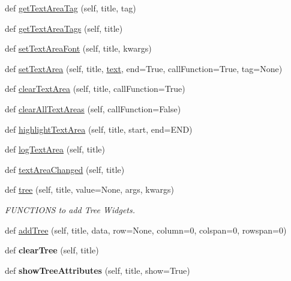 \begin{DoxyCompactItemize}
def \hyperlink{classappjar_1_1gui_a5a0ff51d6c6eb80d9117818b5d18c37d}{get\+Text\+Area\+Tag} (self, title, tag)
\item 
def \hyperlink{classappjar_1_1gui_ab5562f151c9c5f03933d41e09f838507}{get\+Text\+Area\+Tags} (self, title)
\item 
def \hyperlink{classappjar_1_1gui_abbd1a46a2540c6978dbc155158cf46ec}{set\+Text\+Area\+Font} (self, title, kwargs)
\item 
def \hyperlink{classappjar_1_1gui_a4ccd58e1021485bdbdb1a15bc6e9afb2}{set\+Text\+Area} (self, title, \hyperlink{classappjar_1_1gui_a221b516425bf76dd8560ec9f4818182f}{text}, end=True, call\+Function=True, tag=None)
\item 
def \hyperlink{classappjar_1_1gui_ada8714b878a9db8801766b9209c2fe21}{clear\+Text\+Area} (self, title, call\+Function=True)
\item 
def \hyperlink{classappjar_1_1gui_accac45b818ccb4073668fc2fe5490ff9}{clear\+All\+Text\+Areas} (self, call\+Function=False)
\item 
def \hyperlink{classappjar_1_1gui_ade6ea7df6fed5fec97ba454c5ff1c635}{highlight\+Text\+Area} (self, title, start, end=E\+ND)
\item 
def \hyperlink{classappjar_1_1gui_a859cc86dc9ffbf5dbb44fb3d23082da7}{log\+Text\+Area} (self, title)
\item 
def \hyperlink{classappjar_1_1gui_a645bdedd950ff615de7b94a4f2147c67}{text\+Area\+Changed} (self, title)
\item 
def \hyperlink{classappjar_1_1gui_a02a38bc6cd67859779121e194edb93a4}{tree} (self, title, value=None, args, kwargs)
\begin{DoxyCompactList}\small\item\em F\+U\+N\+C\+T\+I\+O\+NS to add Tree Widgets. \end{DoxyCompactList}\item 
def \hyperlink{classappjar_1_1gui_a9bec25f1a4a98f361eeadd875055f95d}{add\+Tree} (self, title, data, row=None, column=0, colspan=0, rowspan=0)
\item 
\mbox{\label{classappjar_1_1gui_a4095ae9f44bd0080b7e287954cdc2158}} 
def {\bfseries clear\+Tree} (self, title)
\item 
\mbox{\label{classappjar_1_1gui_a80925a7915ca374badb132dbc3ffeaf0}} 
def {\bfseries show\+Tree\+Attributes} (self, title, show=True)
\item 
\mbox{\label{classappjar_1_1gui_abbc0d5c15e0d1099535d997d02975cc4}} 

\end{DoxyCompactItemize}
